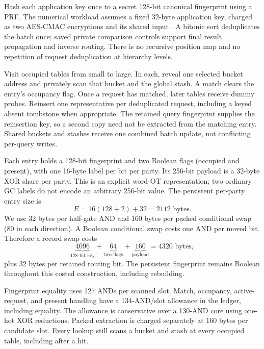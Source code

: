 \documentclass[11pt]{article}
\begin{document}
Hash each application key once to a secret 128-bit canonical fingerprint
using a PRF. The numerical workload assumes a fixed 32-byte application
key, charged as two AES-CMAC encryptions and its shared input \cite{nist-cmac}. A bitonic
sort deduplicates the batch once; saved private comparison controls support
final result propagation and inverse routing. There is no recursive
position map and no repetition of request deduplication at hierarchy levels.

Visit occupied tables from small to large. In each, reveal one selected
bucket address and privately scan that bucket and the global stash. A
match clears the entry's occupancy flag. Once a request has matched, later
tables receive dummy probes. Reinsert one representative per deduplicated
request, including a keyed absent tombstone when appropriate. The retained
query fingerprint supplies the reinsertion key, so a second copy need not
be extracted from the matching entry. Shared buckets and stashes receive
one combined batch update, not conflicting per-query writes.

Each entry holds a 128-bit fingerprint and two Boolean flags (occupied and
present), with one 16-byte label per bit per party. Its 256-bit payload is
a 32-byte XOR share per party. This is an explicit word-OT representation;
two ordinary GC labels do not encode an arbitrary 256-bit value. The
persistent per-party entry size is
\[
 E=16(128+2)+32=2112\text{ bytes}.
\]
We use 32 bytes per half-gate AND and 160 bytes per packed conditional swap
(80 in each direction). A Boolean conditional swap costs one AND per
moved bit. Therefore a record swap costs
\[
 \underbrace{4096}_{128\text{-bit key}}+
 \underbrace{64}_{\text{two flags}}+
 \underbrace{160}_{\text{payload}}=4320\text{ bytes},
\]
plus 32 bytes per retained routing bit. The persistent fingerprint remains
Boolean throughout this costed construction, including rebuilding.

Fingerprint equality uses 127 ANDs per scanned slot. Match, occupancy,
active-request, and present handling have a 134-AND/slot allowance in the
ledger, including equality. The allowance is conservative over a 130-AND
core using one-hot XOR reductions. Packed extraction is charged separately
at 160 bytes per candidate slot. Every lookup still scans a bucket and
stash at every occupied table, including after a hit.
\end{document}
